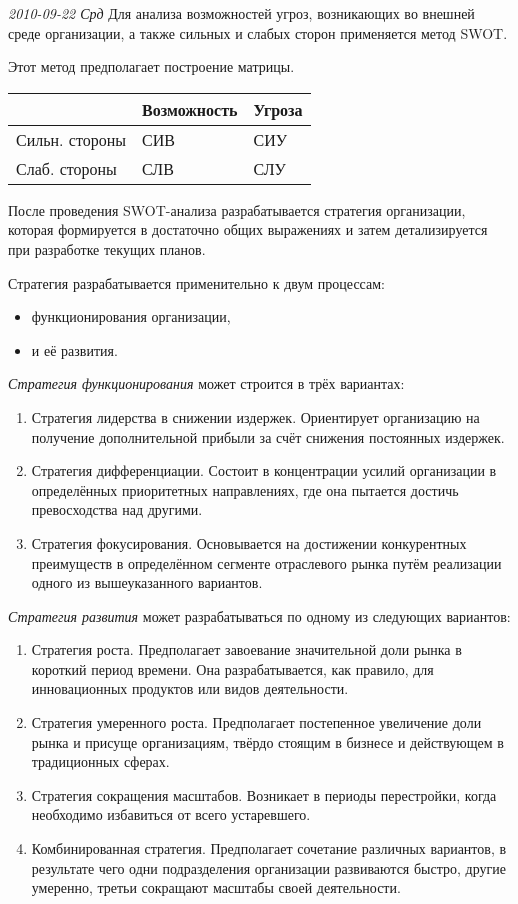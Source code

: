 \documentclass[12pt, russian, oneside, article]{ncc}
\begin{document}
\textit{2010-09-22 Срд}
Для анализа возможностей угроз, возникающих во внешней среде организации, а также сильных и слабых сторон применяется метод SWOT.

Этот метод предполагает построение матрицы.


\begin{center}
\begin{tabular}{lll}
                 &  Возможность  &  Угроза  \\
\hline
 Сильн. стороны  &  СИВ          &  СИУ     \\
 Слаб. стороны   &  СЛВ          &  СЛУ     \\
\end{tabular}
\end{center}



После проведения SWOT-анализа разрабатывается стратегия организации, которая формируется в достаточно общих выражениях и затем детализируется при разработке текущих планов.

Стратегия разрабатывается применительно к двум процессам:
\begin{itemize}
\item функционирования организации,
\item и её развития.
\end{itemize}

\emph{Стратегия функционирования} может строится в трёх вариантах:
\begin{enumerate}
\item Стратегия лидерства в снижении издержек. Ориентирует организацию на получение дополнительной прибыли за счёт снижения постоянных издержек.
\item Стратегия дифференциации. Состоит в концентрации усилий организации в определённых приоритетных направлениях, где она пытается достичь превосходства над другими.
\item Стратегия фокусирования. Основывается на достижении конкурентных преимуществ в определённом сегменте отраслевого рынка путём реализации одного из вышеуказанного вариантов.
\end{enumerate}

\emph{Стратегия развития} может разрабатываться по одному из следующих вариантов:
\begin{enumerate}
\item Стратегия роста. Предполагает завоевание значительной доли рынка в короткий период времени. Она разрабатывается, как правило, для инновационных продуктов или видов деятельности.
\item Стратегия умеренного роста. Предполагает постепенное увеличение доли рынка и присуще организациям, твёрдо стоящим в бизнесе и действующем в традиционных сферах.
\item Стратегия сокращения масштабов. Возникает в периоды перестройки, когда необходимо избавиться от всего устаревшего.
\item Комбинированная стратегия. Предполагает сочетание различных вариантов, в результате чего одни подразделения организации развиваются быстро, другие умеренно, третьи сокращают масштабы своей деятельности.
\end{enumerate}
\end{document}
